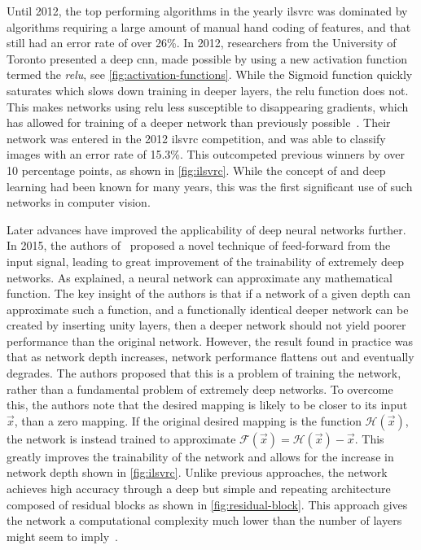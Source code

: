 \documentclass[\rootfolder/main.tex]{subfiles}
\begin{document}
Until 2012, the top performing algorithms in the yearly \acrfull{ilsvrc} was dominated by algorithms requiring a large amount of manual hand coding of features, and that still had an error rate of over 26\%.
In 2012, researchers from the University of Toronto presented a deep \acrshort{cnn}, made possible by using a new activation function termed the \emph{\acrfull{relu}}, see \cref{fig:activation-functions}.
While the Sigmoid function quickly saturates which slows down training in deeper layers, the \acrshort{relu} function does not.
This makes networks using \acrshort{relu} less susceptible to disappearing gradients, which has allowed for training of a deeper network than previously possible~\cite{Krizhevsky2012}.
Their network was entered in the 2012 \acrshort{ilsvrc} competition, and was able to classify images with an error rate of 15.3\%.
This outcompeted previous winners by over 10 percentage points, as shown in \cref{fig:ilsvrc}.
While the concept of  and deep learning had been known for many years, this was the first significant use of such networks in computer vision.

Later advances have improved the applicability of deep neural networks further.
In 2015, the authors of~\cite{He2016} proposed a novel technique of feed-forward from the input signal, leading to great improvement of the trainability of extremely deep networks.
As explained, a neural network can approximate any mathematical function.
The key insight of the authors is that if a network of a given depth can approximate such a function, and a functionally identical deeper network can be created by inserting unity layers, then a deeper network should not yield poorer performance than the original network.
However, the result found in practice was that as network depth increases, network performance flattens out and eventually degrades.
The authors proposed that this is a problem of training the network, rather than a fundamental problem of extremely deep networks.
To overcome this, the authors note that the desired mapping is likely to be closer to its input $\vec{x}$, than a zero mapping.
If the original desired mapping is the function $\mathcal{H}(\vec{x})$, the network is instead trained to approximate $\mathcal{F}(\vec{x}) = \mathcal{H}(\vec{x}) - \vec{x}$.
This greatly improves the trainability of the network and allows for the increase in network depth shown in \cref{fig:ilsvrc}.
Unlike previous approaches, the network achieves high accuracy through a deep but simple and repeating architecture composed of residual blocks as shown in \cref{fig:residual-block}.
This approach gives the network a computational complexity much lower than the number of layers might seem to imply~\cite{He2016}.
\end{document}
